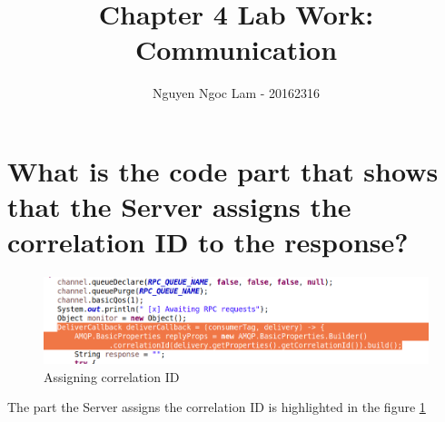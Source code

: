\documentclass[11pt,a4paper]{article}
\title{Chapter 4 Lab Work: Communication}
\date{\displaydate{date}}
\author{Nguyen Ngoc Lam - 20162316}
\begin{document}
  	\maketitle
  	\newpage
  	\tableofcontents
  	\newpage
  	
  	\section{What is the code part that shows that the Server assigns the correlation ID to the response?}
  	\begin{figure}[h!]
  		\includegraphics[width=\linewidth]{assign-corr-id.png}
  		\caption{Assigning correlation ID}
  		\label{fig:corr-id}
	\end{figure}
  	The part the Server assigns the correlation ID is highlighted in the figure \ref{fig:corr-id}
	
\end{document}
